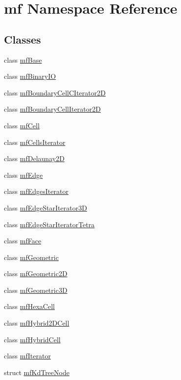 \hypertarget{namespacemf}{
\section{mf Namespace Reference}
\label{namespacemf}
}
\subsection*{Classes}
\begin{DoxyCompactItemize}
\item 
class \hyperlink{classmf_1_1mfBase}{mfBase}
\item 
class \hyperlink{classmf_1_1mfBinaryIO}{mfBinaryIO}
\item 
class \hyperlink{classmf_1_1mfBoundaryCellCIterator2D}{mfBoundaryCellCIterator2D}
\item 
class \hyperlink{classmf_1_1mfBoundaryCellIterator2D}{mfBoundaryCellIterator2D}
\item 
class \hyperlink{classmf_1_1mfCell}{mfCell}
\item 
class \hyperlink{classmf_1_1mfCellsIterator}{mfCellsIterator}
\item 
class \hyperlink{classmf_1_1mfDelaunay2D}{mfDelaunay2D}
\item 
class \hyperlink{classmf_1_1mfEdge}{mfEdge}
\item 
class \hyperlink{classmf_1_1mfEdgesIterator}{mfEdgesIterator}
\item 
class \hyperlink{classmf_1_1mfEdgeStarIterator3D}{mfEdgeStarIterator3D}
\item 
class \hyperlink{classmf_1_1mfEdgeStarIteratorTetra}{mfEdgeStarIteratorTetra}
\item 
class \hyperlink{classmf_1_1mfFace}{mfFace}
\item 
class \hyperlink{classmf_1_1mfGeometric}{mfGeometric}
\item 
class \hyperlink{classmf_1_1mfGeometric2D}{mfGeometric2D}
\item 
class \hyperlink{classmf_1_1mfGeometric3D}{mfGeometric3D}
\item 
class \hyperlink{classmf_1_1mfHexaCell}{mfHexaCell}
\item 
class \hyperlink{classmf_1_1mfHybrid2DCell}{mfHybrid2DCell}
\item 
class \hyperlink{classmf_1_1mfHybridCell}{mfHybridCell}
\item 
class \hyperlink{classmf_1_1mfIterator}{mfIterator}
\item 
struct \hyperlink{structmf_1_1mfKdTreeNode}{mfKdTreeNode}

\end{DoxyCompactItemize}
